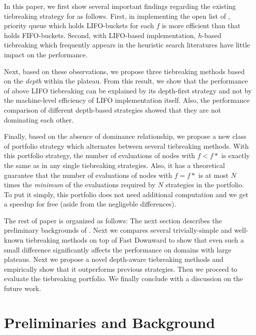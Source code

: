 In this paper, we first show several important findings regarding the
existing tiebreaking strategy for \astar as follows.
% 
First, in implementing the open list of \astar, priority queue which holds
LIFO-buckets for each $f$ is more efficient than that holds FIFO-buckets.
% 
Second, with LIFO-based implementation, $h$-based tiebreaking which
frequently appears in the heuristic search literatures have little
impact on the performance.
% 

Next, based on these observations, we propose three tiebreaking methods
based on the \emph{depth} within the plateau.  From this result, we show
that the performance of above LIFO tiebreaking can be explained by its
depth-first strategy and not by the machine-level efficiency of LIFO
implementation itself.  Also, the performance comparison of different
depth-based strategies showed that they are not dominating each other.

Finally, based on the absence of dominance relationship, we propose a
new class of portfolio strategy which alternates between several
tiebreaking methods.
% 
With this portfolio strategy,
the number of evaluations of nodes with $f<f*$ is exactly the same as
in any single tiebreaking strategies.
Also, it has a theoretical guarantee that
the number of evaluations of nodes with $f=f*$ is at most $N$ times the \emph{minimum} 
of the evaluations required by $N$ strategies in the portfolio.
To put it simply, this portfolio does not need additional computation
and we get a speedup for free (aside from the negligeble differences).

The rest of paper is organized as follows: The next section describes the
preliminary backgrounds of \astar.
Next we compares several trivially-simple and well-known tiebreaking
methods on top of Fast Downward to show that even such a small
difference significantly affects the performance on domains with
large plateaus.
Next we propose a novel depth-aware tiebreaking methods and empirically
show that it outperforms previous strategies.
Then we proceed to evaluate the tiebreaking portfolio.
We finally conclude with a discussion on the future work.

\section{Preliminaries and Background}

